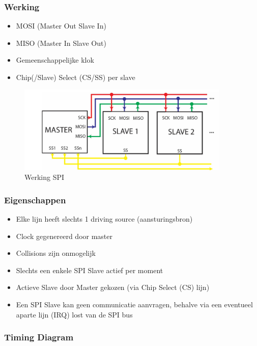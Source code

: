\documentclass{article}
\begin{document}
\subsubsection{Werking}
\begin{itemize}
    \item MOSI (Master Out Slave In)
    \item MISO (Master In Slave Out)
    \item Gemeenschappelijke klok
    \item Chip(/Slave) Select (CS/SS) per slave
\end{itemize}

\begin{figure}[H]
    \centering
    \includegraphics[width=0.9\textwidth]{Screenshot_20200330_113936.png}
    \caption{Werking SPI}
\end{figure}

\subsubsection{Eigenschappen}

\begin{itemize}
    \item Elke lijn heeft slechts 1 driving source (aansturingsbron)
    \item Clock gegenereerd door master
    \item Collisions zijn onmogelijk
    \item Slechts een enkele SPI Slave actief per moment
    \item Actieve Slave door Master gekozen (via Chip Select (CS) lijn)
    \item Een SPI Slave kan geen communicatie aanvragen, behalve via een eventueel aparte lijn (IRQ) lost van de SPI bus
\end{itemize}

\subsubsection{Timing Diagram}
\end{document}
